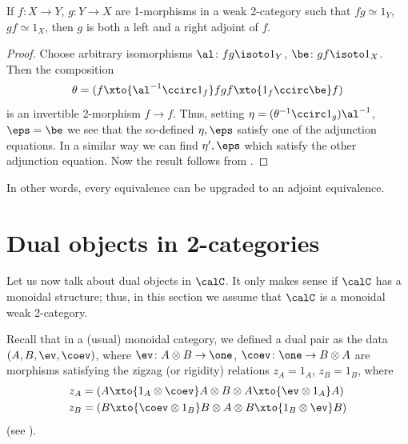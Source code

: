 \begin{lemma}\label{l:adjoint-equivalence}
  If $f\colon X\to Y$, $g\colon Y\to X$ are 1-morphisms in a weak
  2-category such that $fg\simeq 1_Y$, $gf\simeq 1_X$, then
  $g$ is both a left and a right adjoint of $f$.
\end{lemma}
\begin{proof}
  Choose arbitrary isomorphisms $\al\colon fg\isoto 1_Y$, $\be \colon gf\isoto
  1_X$. Then the composition
  $$
  \theta = (f\xto{ \al^{-1} \ccirc 1_f} fgf\xto{1_f\ccirc \be} f)
  $$
  is an invertible 2-morphism $f\to f$. Thus, setting $\eta = (\theta^{-1}\ccirc
  1_g) \al^{-1}$, $\eps = \be$ we see that the so-defined $\eta, \eps$ satisfy one
  of the adjunction equations. In a similar way we can find $\eta', \eps$ which
  satisfy the other adjunction equation. Now the result follows from
  .
\end{proof}
In other words, every equivalence can be upgraded to an adjoint equivalence.



%
%

\section{Dual objects in 2-categories}\label{s:coherent-dual-pair}

Let us now talk about dual objects in $\calC$. It only makes sense
if $\calC$ has a monoidal structure; thus, in this section we assume that
$\calC$ is a monoidal weak 2-category.

Recall that in a (usual) monoidal category, we defined a dual pair as the data
$(A,B, \ev, \coev)$, where $\ev\colon A\otimes B\to \one$,
$\coev \colon \one \to B\otimes A$ are morphisms satisfying the zigzag (or
rigidity) relations $z_A= 1_A$, $z_B = 1_B$, where
\begin{equation}\label{e:zigzags}
    \begin{aligned}
        z_A&= (A\xto{1_A\otimes \coev} A\otimes B \otimes A \xto{\ev\otimes
        1_A} A)\\
        z_B &= (B \xto{\coev \otimes 1_B} B\otimes A \otimes B
        \xto{1_B\otimes\ev} B)
\end{aligned}
\end{equation}
(see ).

